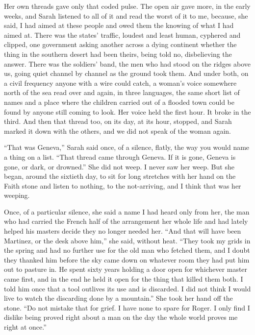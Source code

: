 Her own threads gave only that coded pulse. The open air gave more, in the early weeks, and Sarah listened to all of it and read the worst of it to me, because, she said, I had aimed at these people and owed them the knowing of what I had aimed at. There was the states' traffic, loudest and least human, cyphered and clipped, one government asking another across a dying continent whether the thing in the southern desert had been theirs, being told no, disbelieving the answer. There was the soldiers' band, the men who had stood on the ridges above us, going quiet channel by channel as the ground took them. And under both, on a civil frequency anyone with a wire could catch, a woman's voice somewhere north of the sea read over and again, in three languages, the same short list of names and a place where the children carried out of a flooded town could be found by anyone still coming to look. Her voice held the first hour. It broke in the third. And then that thread too, on its day, at its hour, stopped, and Sarah marked it down with the others, and we did not speak of the woman again.\par

``That was Geneva,'' Sarah said once, of a silence, flatly, the way you would name a thing on a list. ``That thread came through Geneva. If it is gone, Geneva is gone, or dark, or drowned.'' She did not weep. I never saw her weep. But she began, around the sixtieth day, to sit for long stretches with her hand on the Faith stone and listen to nothing, to the not-arriving, and I think that was her weeping.\par

Once, of a particular silence, she said a name I had heard only from her, the man who had carried the French half of the arrangement her whole life and had lately helped his masters decide they no longer needed her. ``And that will have been Martinez, or the desk above him,'' she said, without heat. ``They took my grids in the spring and had no further use for the old man who fetched them, and I doubt they thanked him before the sky came down on whatever room they had put him out to pasture in. He spent sixty years holding a door open for whichever master came first, and in the end he held it open for the thing that killed them both. I told him once that a tool outlives its use and is discarded. I did not think I would live to watch the discarding done by a mountain.'' She took her hand off the stone. ``Do not mistake that for grief. I have none to spare for Roger. I only find I dislike being proved right about a man on the day the whole world proves me right at once.''\par

